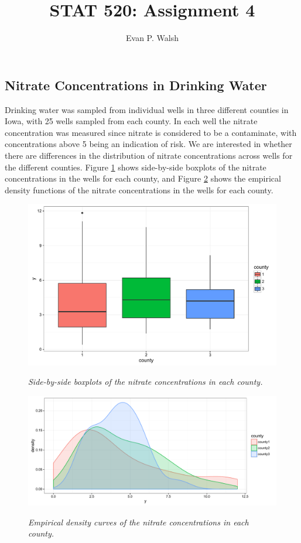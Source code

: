 \documentclass[12pt]{article}
\title{STAT 520: Assignment 4}
\author{Evan P. Walsh}
\begin{document}

\subsection*{Nitrate Concentrations in Drinking Water}

Drinking water was sampled from individual wells in three different counties in Iowa, with 25 wells sampled from each county. In each well the nitrate
concentration was measured since nitrate is considered to be a contaminate, with concentrations above 5 being an indication of risk.
We are interested in whether there are differences in the distribution of nitrate concentrations across wells for the different counties.
Figure \ref{boxplot} shows side-by-side boxplots of the nitrate concentrations in the wells for each county, and Figure \ref{density} shows the empirical density
functions of the nitrate concentrations in the wells for each county.

\begin{figure}[h]
  \caption{\emph{Side-by-side boxplots of the nitrate concentrations in each county.}}
  \centering
  \includegraphics[width=.7\textwidth]{./figures/hw04_boxplots.pdf}
  \label{boxplot}
\end{figure}

\begin{figure}[h]
  \caption{\emph{Empirical density curves of the nitrate concentrations in each county.}}
  \centering
  \includegraphics[width=.82\textwidth]{./figures/hw04_density.pdf}
  \label{density}
\end{figure}
\end{document}
